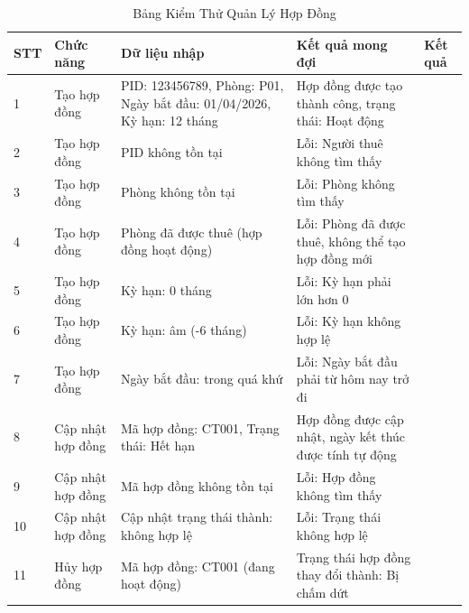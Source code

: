 \documentclass[12pt,a4paper]{article}
\begin{document}
\begin{table}[h!]
    \centering
    \caption{Bảng Kiểm Thử Quản Lý Hợp Đồng}
    \label{tab:contract_management}
    \vspace{2mm}

    \begin{small}
    \begin{tabularx}{\textwidth}{|p{0.8cm}|p{2.5cm}|p{3cm}|p{3cm}|p{2.5cm}|}
    \hline
    \textbf{STT} & \textbf{Chức năng} & \textbf{Dữ liệu nhập} & \textbf{Kết quả mong đợi} & \textbf{Kết quả} \\ \hline

    1 & Tạo hợp đồng & PID: 123456789, Phòng: P01, Ngày bắt đầu: 01/04/2026, Kỳ hạn: 12 tháng & Hợp đồng được tạo thành công, trạng thái: Hoạt động & \\ \hline

    2 & Tạo hợp đồng & PID không tồn tại & Lỗi: Người thuê không tìm thấy & \\ \hline

    3 & Tạo hợp đồng & Phòng không tồn tại & Lỗi: Phòng không tìm thấy & \\ \hline

    4 & Tạo hợp đồng & Phòng đã được thuê (hợp đồng hoạt động) & Lỗi: Phòng đã được thuê, không thể tạo hợp đồng mới & \\ \hline

    5 & Tạo hợp đồng & Kỳ hạn: 0 tháng & Lỗi: Kỳ hạn phải lớn hơn 0 & \\ \hline

    6 & Tạo hợp đồng & Kỳ hạn: âm (-6 tháng) & Lỗi: Kỳ hạn không hợp lệ & \\ \hline

    7 & Tạo hợp đồng & Ngày bắt đầu: trong quá khứ & Lỗi: Ngày bắt đầu phải từ hôm nay trở đi & \\ \hline

    8 & Cập nhật hợp đồng & Mã hợp đồng: CT001, Trạng thái: Hết hạn & Hợp đồng được cập nhật, ngày kết thúc được tính tự động & \\ \hline

    9 & Cập nhật hợp đồng & Mã hợp đồng không tồn tại & Lỗi: Hợp đồng không tìm thấy & \\ \hline

    10 & Cập nhật hợp đồng & Cập nhật trạng thái thành: không hợp lệ & Lỗi: Trạng thái không hợp lệ & \\ \hline

    11 & Hủy hợp đồng & Mã hợp đồng: CT001 (đang hoạt động) & Trạng thái hợp đồng thay đổi thành: Bị chấm dứt & \\ \hline


\end{tabularx}
\end{small}
\end{table}
\end{document}

